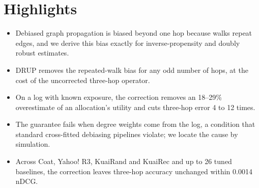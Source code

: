 \documentclass[12pt]{article}
\begin{document}
\section*{Highlights}
\begin{itemize}
\item Debiased graph propagation is biased beyond one hop because walks repeat edges, and we derive this bias exactly for inverse-propensity and doubly robust estimates.
\item DRUP removes the repeated-walk bias for any odd number of hops, at the cost of the uncorrected three-hop operator.
\item On a log with known exposure, the correction removes an 18--29\% overestimate of an allocation's utility and cuts three-hop error 4 to 12 times.
\item The guarantee fails when degree weights come from the log, a condition that standard cross-fitted debiasing pipelines violate; we locate the cause by simulation.
\item Across Coat, Yahoo! R3, KuaiRand and KuaiRec and up to 26 tuned baselines, the correction leaves three-hop accuracy unchanged within 0.0014 nDCG.
\end{itemize}
\end{document}
